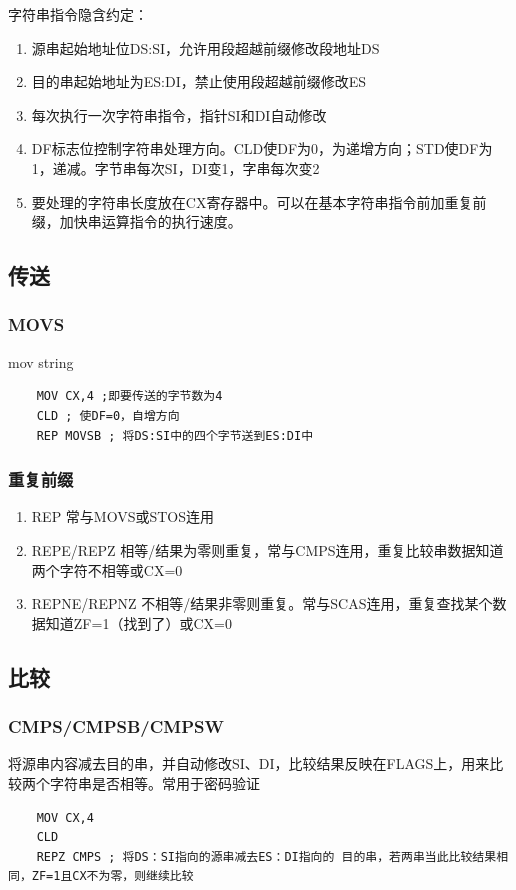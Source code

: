 字符串指令隐含约定：
\begin{enumerate}
    \item 源串起始地址位DS:SI，允许用段超越前缀修改段地址DS
    \item 目的串起始地址为ES:DI，禁止使用段超越前缀修改ES
    \item 每次执行一次字符串指令，指针SI和DI自动修改
    \item DF标志位控制字符串处理方向。CLD使DF为0，为递增方向；STD使DF为1，递减。字节串每次SI，DI变1，字串每次变2
    \item 要处理的字符串长度放在CX寄存器中。可以在基本字符串指令前加重复前缀，加快串运算指令的执行速度。
\end{enumerate}
\subsection{传送}
\subsubsection{MOVS}
mov string
\begin{lstlisting}
    MOV CX,4 ;即要传送的字节数为4
    CLD ; 使DF=0，自增方向
    REP MOVSB ; 将DS:SI中的四个字节送到ES:DI中
\end{lstlisting}
\subsubsection{重复前缀}
\begin{enumerate}
    \item REP 常与MOVS或STOS连用
    \item REPE/REPZ 相等/结果为零则重复，常与CMPS连用，重复比较串数据知道两个字符不相等或CX=0
    \item REPNE/REPNZ 不相等/结果非零则重复。常与SCAS连用，重复查找某个数据知道ZF=1（找到了）或CX=0
\end{enumerate}
\subsection{比较}
\subsubsection{CMPS/CMPSB/CMPSW}
将源串内容减去目的串，并自动修改SI、DI，比较结果反映在FLAGS上，用来比较两个字符串是否相等。常用于密码验证
\begin{lstlisting}
    MOV CX,4
    CLD
    REPZ CMPS ; 将DS：SI指向的源串减去ES：DI指向的 目的串，若两串当此比较结果相同，ZF=1且CX不为零，则继续比较
\end{lstlisting}

